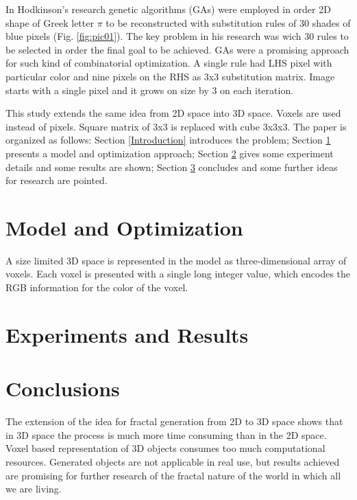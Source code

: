 \documentclass{llncs}
\begin{document}
In Hodkinson's research genetic algorithms (GAs) were employed in order 2D shape of Greek letter $\pi$ to be reconstructed with substitution rules of 30 shades of blue pixels (Fig. \ref{fig:pic01}). The key problem in his research was wich 30 rules to be selected in order the final goal to be achieved. GAs were a promising approach for such kind of combinatorial optimization. A single rule had LHS pixel with particular color and nine pixels on the RHS as 3x3 substitution matrix. Image starts with a single pixel and it grows on size by 3 on each iteration. 

This study extends the same idea from 2D space into 3D space. Voxels are used instead of pixels. Square matrix of 3x3 is replaced with cube 3x3x3. The paper is organized as follows: Section \ref{Introduction} introduces the problem; Section \ref{Model and Optimization} presents a model and optimization approach; Section \ref{Experiments and Results} gives some experiment details and some results are shown; Section \ref{Conclusions} concludes and some further ideas for research are pointed.

\section{Model and Optimization} \label{Model and Optimization}

A size limited 3D space is represented in the model as three-dimensional array of voxels. Each voxel is presented with a single long integer value, which encodes the RGB information for the color of the voxel. 

\section{Experiments and Results} \label{Experiments and Results}

\section{Conclusions} \label{Conclusions}

The extension of the idea for fractal generation from 2D to 3D space shows that in 3D space the process is much more time consuming than in the 2D space. Voxel based representation of 3D objects consumes too much computational resources. Generated objects are not applicable in real use, but results achieved are promising for further research of the fractal nature of the world in which all we are living. 
\end{document}
